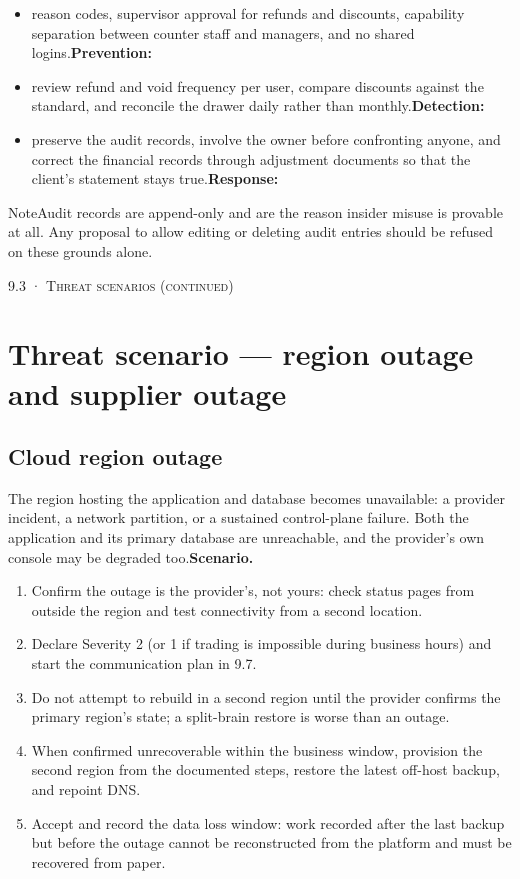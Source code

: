 \documentclass[11pt,a4paper,oneside]{book}
\begin{document}
\begin{itemize}
\item reason codes, supervisor approval for refunds and discounts, capability separation between counter staff and managers, and no shared logins.\textbf{Prevention:}
\item review refund and void frequency per user, compare discounts against the standard, and reconcile the drawer daily rather than monthly.\textbf{Detection:}
\item preserve the audit records, involve the owner before confronting anyone, and correct the financial records through adjustment documents so that the client's statement stays true.\textbf{Response:}
\end{itemize}
\begin{notebox}NoteAudit records are append-only and are the reason insider misuse is provable at all. Any proposal to allow editing or deleting audit entries should be refused on these grounds alone.\end{notebox}
\textsc{\small\color{crimson}9.3 · Threat scenarios (continued)}\par\medskip
\section*{Threat scenario — region outage and supplier outage}
\subsection*{Cloud region outage}
The region hosting the application and database becomes unavailable: a provider incident, a network partition, or a sustained control-plane failure. Both the application and its primary database are unreachable, and the provider's own console may be degraded too.\textbf{Scenario.}

\begin{enumerate}
\item Confirm the outage is the provider's, not yours: check status pages from outside the region and test connectivity from a second location.
\item Declare Severity 2 (or 1 if trading is impossible during business hours) and start the communication plan in 9.7.
\item Do not attempt to rebuild in a second region until the provider confirms the primary region's state; a split-brain restore is worse than an outage.
\item When confirmed unrecoverable within the business window, provision the second region from the documented steps, restore the latest off-host backup, and repoint DNS.
\item Accept and record the data loss window: work recorded after the last backup but before the outage cannot be reconstructed from the platform and must be recovered from paper.
\end{enumerate}
\end{document}
